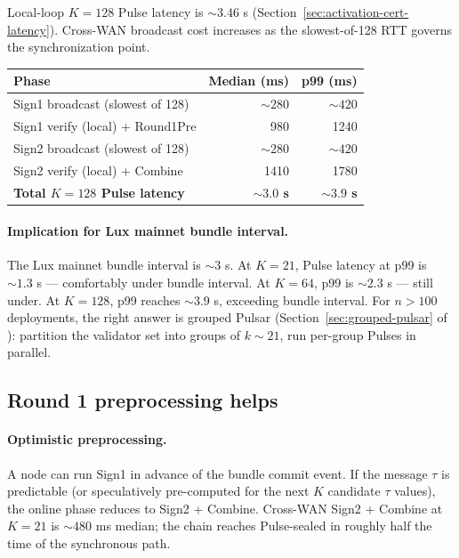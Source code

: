 Local-loop $K=128$ Pulse latency is $\sim 3.46$ s (Section~\ref{sec:activation-cert-latency}). Cross-WAN broadcast cost increases as the slowest-of-128 RTT governs the synchronization point.

\begin{tabular}{@{}lrr@{}}
  \toprule
  \textbf{Phase} & \textbf{Median (ms)} & \textbf{p99 (ms)} \\
  \midrule
  Sign1 broadcast (slowest of 128) & $\sim 280$ & $\sim 420$ \\
  Sign1 verify (local) + Round1Pre & 980 & 1240 \\
  Sign2 broadcast (slowest of 128) & $\sim 280$ & $\sim 420$ \\
  Sign2 verify (local) + Combine & 1410 & 1780 \\
  \midrule
  \textbf{Total $K=128$ Pulse latency} & \textbf{$\sim 3.0$ s} & \textbf{$\sim 3.9$ s} \\
  \bottomrule
\end{tabular}

\paragraph{Implication for Lux mainnet bundle interval.} The Lux mainnet bundle interval is $\sim 3$ s. At $K = 21$, Pulse latency at p99 is $\sim 1.3$ s --- comfortably under bundle interval. At $K = 64$, p99 is $\sim 2.3$ s --- still under. At $K = 128$, p99 reaches $\sim 3.9$ s, exceeding bundle interval. For $n > 100$ deployments, the right answer is grouped Pulsar (Section~\ref{sec:grouped-pulsar} of \cite{luxquasarhorizon}): partition the validator set into groups of $k \sim 21$, run per-group Pulses in parallel.

\subsection{Round 1 preprocessing helps}

\paragraph{Optimistic preprocessing.} A node can run Sign1 in advance of the bundle commit event. If the message $\tau$ is predictable (or speculatively pre-computed for the next $K$ candidate $\tau$ values), the online phase reduces to Sign2 + Combine. Cross-WAN Sign2 + Combine at $K=21$ is $\sim 480$ ms median; the chain reaches Pulse-sealed in roughly half the time of the synchronous path.

